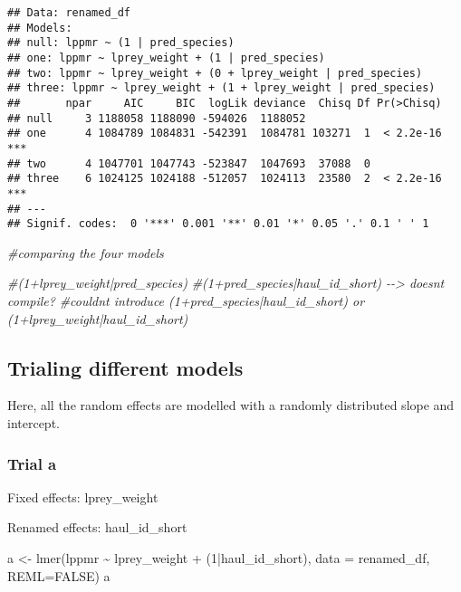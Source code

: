 \documentclass[
]{article}
\newenvironment{Shaded}{\begin{snugshade}}{\end{snugshade}}
\newcommand{\AttributeTok}[1]{\textcolor[rgb]{0.77,0.63,0.00}{#1}}
\newcommand{\CommentTok}[1]{\textcolor[rgb]{0.56,0.35,0.01}{\textit{#1}}}
\newcommand{\ConstantTok}[1]{\textcolor[rgb]{0.00,0.00,0.00}{#1}}
\newcommand{\DecValTok}[1]{\textcolor[rgb]{0.00,0.00,0.81}{#1}}
\newcommand{\FunctionTok}[1]{\textcolor[rgb]{0.00,0.00,0.00}{#1}}
\newcommand{\NormalTok}[1]{#1}
\newcommand{\OtherTok}[1]{\textcolor[rgb]{0.56,0.35,0.01}{#1}}
\newcommand{\SpecialCharTok}[1]{\textcolor[rgb]{0.00,0.00,0.00}{#1}}
\begin{document}
\begin{verbatim}
## Data: renamed_df
## Models:
## null: lppmr ~ (1 | pred_species)
## one: lppmr ~ lprey_weight + (1 | pred_species)
## two: lppmr ~ lprey_weight + (0 + lprey_weight | pred_species)
## three: lppmr ~ lprey_weight + (1 + lprey_weight | pred_species)
##       npar     AIC     BIC  logLik deviance  Chisq Df Pr(>Chisq)    
## null     3 1188058 1188090 -594026  1188052                         
## one      4 1084789 1084831 -542391  1084781 103271  1  < 2.2e-16 ***
## two      4 1047701 1047743 -523847  1047693  37088  0               
## three    6 1024125 1024188 -512057  1024113  23580  2  < 2.2e-16 ***
## ---
## Signif. codes:  0 '***' 0.001 '**' 0.01 '*' 0.05 '.' 0.1 ' ' 1
\end{verbatim}

\begin{Shaded}
\begin{Highlighting}[]
\CommentTok{\#comparing the four models}

\CommentTok{\#(1+lprey\_weight|pred\_species)}
\CommentTok{\#(1+pred\_species|haul\_id\_short) {-}{-}\textgreater{} doesn\textquotesingle{}t compile?}
\CommentTok{\#couldn\textquotesingle{}t introduce (1+pred\_species|haul\_id\_short) or (1+lprey\_weight|haul\_id\_short)}
\end{Highlighting}
\end{Shaded}

\hypertarget{trialing-different-models}{%
\subsection{Trialing different models}\label{trialing-different-models}}

Here, all the random effects are modelled with a randomly distributed
slope and intercept.

\hypertarget{trial-a}{%
\subsubsection{Trial a}\label{trial-a}}

Fixed effects: lprey\_weight

Renamed effects: haul\_id\_short

\begin{Shaded}
\begin{Highlighting}[]
\NormalTok{a }\OtherTok{\textless{}{-}} \FunctionTok{lmer}\NormalTok{(lppmr }\SpecialCharTok{\textasciitilde{}}\NormalTok{ lprey\_weight }\SpecialCharTok{+}\NormalTok{ (}\DecValTok{1}\SpecialCharTok{|}\NormalTok{haul\_id\_short), }\AttributeTok{data =}\NormalTok{ renamed\_df, }\AttributeTok{REML=}\ConstantTok{FALSE}\NormalTok{)}
\NormalTok{a}
\end{Highlighting}
\end{Shaded}
\end{document}

